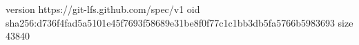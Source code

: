 version https://git-lfs.github.com/spec/v1
oid sha256:d736f4fad5a5101e45f7693f58689e31be8f0f77c1c1bb3db5fa5766b5983693
size 43840
